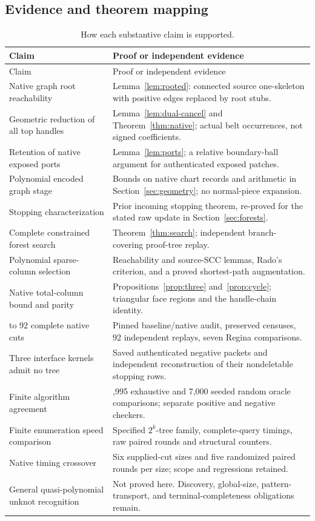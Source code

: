 \subsection{Evidence and theorem mapping}
\begin{longtable}{>{\raggedright\arraybackslash}p{}>{\raggedright\arraybackslash}p{}}
\caption{How each substantive claim is supported.}\label{tab:claims}\\
\toprule
Claim & Proof or independent evidence\\
\midrule\endfirsthead
\toprule Claim & Proof or independent evidence\\\midrule\endhead
Native graph root reachability & Lemma~\ref{lem:rooted}: connected source
one-skeleton with positive edges replaced by root stubs.\\
Geometric reduction of all top handles & Lemma~\ref{lem:dual-cancel} and
Theorem~\ref{thm:native}; actual belt occurrences, not signed coefficients.\\
Retention of native exposed ports & Lemma~\ref{lem:ports}; a relative
boundary-ball argument for authenticated exposed patches.\\
Polynomial encoded graph stage & Bounds on native chart records and
arithmetic in Section~\ref{sec:geometry}; no normal-piece expansion.\\
Stopping characterization & Prior incoming stopping theorem, re-proved
for the stated raw update in Section~\ref{sec:forests}.\\
Complete constrained forest search & Theorem~\ref{thm:search}; independent
branch-covering proof-tree replay.\\
Polynomial sparse-column selection & Reachability and source-SCC lemmas,
Rado's criterion, and a proved shortest-path augmentation.\\
Native total-column bound and parity & Propositions~\ref{prop:three}
and~\ref{prop:cycle}; triangular face regions and the handle-chain identity.\\
85 to 92 complete native cuts & Pinned baseline/native audit, preserved
censuses, 92 independent replays, seven Regina comparisons.\\
Three interface kernels admit no tree & Saved authenticated negative
packets and independent reconstruction of their nondeletable stopping rows.\\
Finite algorithm agreement & 26,995 exhaustive and 7,000 seeded random
oracle comparisons; separate positive and negative checkers.\\
Finite enumeration speed comparison & Specified $2^k$-tree family,
complete-query timings, raw paired rounds and structural counters.\\
Native timing crossover & Six supplied-cut sizes and five randomized
paired rounds per size; scope and regressions retained.\\
General quasi-polynomial unknot recognition & Not proved here.  Discovery,
global-size, pattern-transport, and terminal-completeness obligations remain.\\
\bottomrule
\end{longtable}

